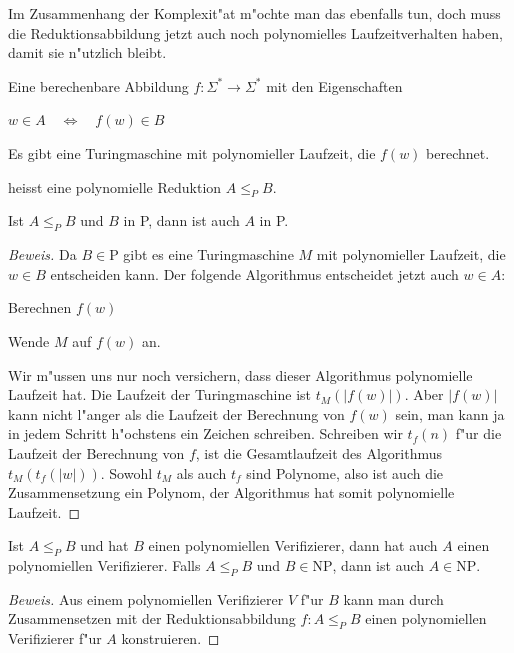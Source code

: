 Im Zusammenhang der Komplexit"at m"ochte man das ebenfalls
tun, doch muss die Reduktionsabbildung jetzt auch noch 
polynomielles Laufzeitverhalten haben, damit sie n"utzlich
bleibt.

\begin{definition}
Eine berechenbare Abbildung $f\colon \Sigma^*\to\Sigma^*$
mit den Eigenschaften
\begin{compactenum}
\item $w\in A\quad\Leftrightarrow\quad f(w)\in B$
\item Es gibt eine Turingmaschine mit polynomieller Laufzeit, die
$f(w)$ berechnet.
\end{compactenum}
heisst eine polynomielle Reduktion $A\le_P B$.
\end{definition}

\begin{satz}
\label{polynomiellreduction}
Ist $A\le_P B$ und $B$ in P, dann ist auch $A$ in P.
\end{satz}

\begin{proof}[Beweis]
Da $B\in\text{P}$ gibt es eine Turingmaschine $M$ mit polynomieller Laufzeit,
die $w\in B$ entscheiden kann. Der folgende Algorithmus entscheidet
jetzt auch $w\in A$:
\begin{compactenum}
\item Berechnen $f(w)$
\item Wende $M$ auf $f(w)$ an.
\end{compactenum}
Wir m"ussen uns nur noch versichern, dass dieser Algorithmus 
polynomielle Laufzeit hat. Die Laufzeit der Turingmaschine ist
$t_M(|f(w)|)$. Aber $|f(w)|$ kann nicht l"anger als die Laufzeit 
der Berechnung von $f(w)$ sein, man kann ja in jedem Schritt h"ochstens
ein Zeichen schreiben. Schreiben wir $t_f(n)$ f"ur die Laufzeit
der Berechnung von $f$, ist die Gesamtlaufzeit des Algorithmus
$t_M(t_f(|w|))$. Sowohl $t_M$ als auch $t_f$ sind Polynome, 
also ist auch die Zusammensetzung ein Polynom, der Algorithmus
hat somit polynomielle Laufzeit.
\end{proof}

\begin{satz}
Ist $A\le_P B$ und hat $B$ einen polynomiellen Verifizierer, dann
hat auch $A$ einen polynomiellen Verifizierer. Falls $A\le_P B$ und 
$B\in\text{NP}$, dann ist auch $A\in\text{NP}$.
\end{satz}

\begin{proof}[Beweis]
Aus einem polynomiellen Verifizierer $V$ f"ur $B$ kann man durch
Zusammensetzen mit der Reduktionsabbildung $f\colon A\le_P B$
einen polynomiellen Verifizierer f"ur $A$ konstruieren.
\end{proof}

